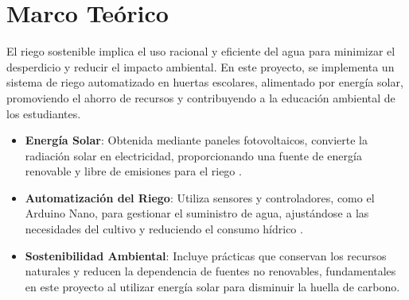 \documentclass[12pt]{article}
\begin{document}
\newpage
\section{Marco Teórico}

El riego sostenible implica el uso racional y eficiente del agua para minimizar el desperdicio y reducir el impacto ambiental. En este proyecto, se implementa un sistema de riego automatizado en huertas escolares, alimentado por energía solar, promoviendo el ahorro de recursos y contribuyendo a la educación ambiental de los estudiantes.

\begin{itemize}
      \item \textbf{Energía Solar}: Obtenida mediante paneles fotovoltaicos, convierte la radiación solar en electricidad, proporcionando una fuente de energía renovable y libre de emisiones para el riego \cite{Repsol2024}.
      \item \textbf{Automatización del Riego}: Utiliza sensores y controladores, como el Arduino Nano, para gestionar el suministro de agua, ajustándose a las necesidades del cultivo y reduciendo el consumo hídrico \cite{MaherElectronica2021}.
      \item \textbf{Sostenibilidad Ambiental}: Incluye prácticas que conservan los recursos naturales y reducen la dependencia de fuentes no renovables, fundamentales en este proyecto al utilizar energía solar para disminuir la huella de carbono.
\end{itemize}
\end{document}
